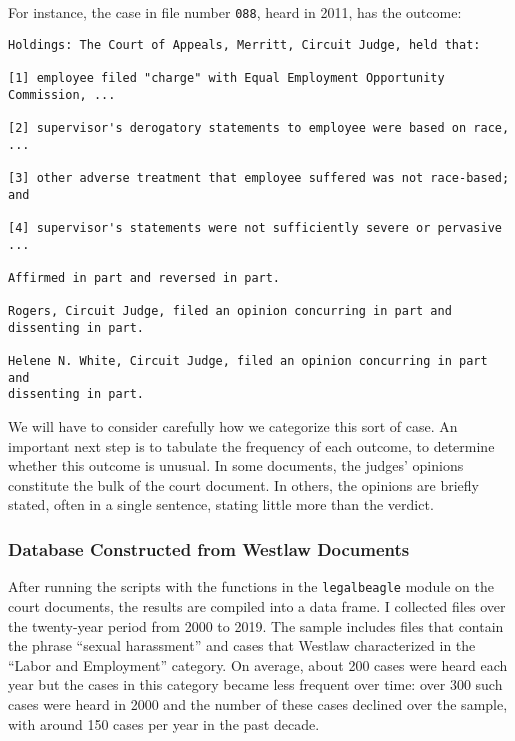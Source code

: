 \documentclass[11pt]{paper}
\begin{document}
For instance, the case in file number \texttt{088}, heard in 2011, 
has the outcome:
%
\begin{verbatim}
Holdings: The Court of Appeals, Merritt, Circuit Judge, held that:
 
[1] employee filed "charge" with Equal Employment Opportunity Commission, ...
 
[2] supervisor's derogatory statements to employee were based on race, ...
 
[3] other adverse treatment that employee suffered was not race-based; and
 
[4] supervisor's statements were not sufficiently severe or pervasive ...
 
Affirmed in part and reversed in part.
 
Rogers, Circuit Judge, filed an opinion concurring in part and dissenting in part.
 
Helene N. White, Circuit Judge, filed an opinion concurring in part and 
dissenting in part.
\end{verbatim}
%
We will have to consider carefully how we categorize this sort of case. 
An important next step is to tabulate the frequency of each outcome, to 
determine whether this outcome is unusual. 
In some documents, the judges' opinions constitute the bulk of the court 
document. 
In others, the opinions are briefly stated, often in a single sentence, 
stating little more than the verdict. 

\subsubsection*{Database Constructed from Westlaw Documents}

After running the scripts with the functions in the \texttt{legalbeagle} module 
on the court documents, the results are compiled into a data frame. 
I collected files over the twenty-year period from 2000 to 2019. 
The sample includes files that contain the phrase ``sexual harassment'' 
and cases that Westlaw characterized in the ``Labor and Employment'' category. 
On average,  about 200 cases were heard each year
but the cases in this category became less frequent over time:
over 300 such cases were heard in 2000 
and the number of these cases declined over the sample, with around 150 cases 
per year in the past decade. 
\end{document}
